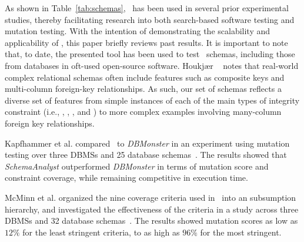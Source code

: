 


As shown in Table~\ref{tab:schemas}, \sa~has been used in several prior experimental studies, thereby facilitating
research into both search-based software testing and mutation testing. With the intention of demonstrating the
scalability and applicability of \sa, this paper briefly reviews past results. It is important to note that, to date,
the presented tool has been used to test \numtestedschemas~schemas, including those from databases in oft-used
open-source software. Houkj{\ae}r \etal~\cite{Houkjaer2006} notes that real-world complex relational schemas often
include features such as composite keys and multi-column foreign-key relationships. As such, our set of schemas reflects
a diverse set of features from simple instances of each of the main types of integrity constraint (i.e., \PKCs, \FKCs,
\UCs, \NNCs and \CCs) to more complex examples involving many-column foreign key relationships.

Kapfhammer et al. compared \sa~to \textit{DBMonster} in an experiment using mutation testing over
three DBMSs and 25 database schemas~\cite{kapfhammer2013search}. The results showed that \textit{SchemaAnalyst}
outperformed \textit{DBMonster} in terms of mutation score and constraint coverage, while remaining competitive in
execution time.

McMinn et al. organized the nine coverage criteria used in \sa~into an subsumption hierarchy, and
investigated the effectiveness of the criteria in a study across three DBMSs and 32 database
schemas~\cite{mcminn2015effectiveness}.  The results showed mutation scores as low as $12\%$ for the least stringent
criteria, to as high as $96\%$ for the most stringent.

